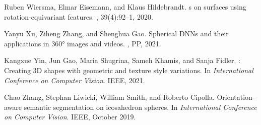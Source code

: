 \documentclass[10pt,twocolumn,letterpaper]{article}
\begin{document}
\begin{thebibliography}{10}
Ruben Wiersma, Elmar Eisemann, and Klaus Hildebrandt.
s on surfaces using rotation-equivariant features.
, 39(4):92--1, 2020.

Yanyu Xu, Ziheng Zhang, and Shenghua Gao.
\newblock Spherical {DNNs} and their applications in 360° images and videos.
, PP,
  2021.

Kangxue Yin, Jun Gao, Maria Shugrina, Sameh Khamis, and Sanja Fidler.
: Creating {3D} shapes with geometric and texture style
  variations.
\newblock In {\em International Conference on Computer Vision}. IEEE, 2021.

Chao Zhang, Stephan Liwicki, William Smith, and Roberto Cipolla.
\newblock Orientation-aware semantic segmentation on icosahedron spheres.
\newblock In {\em International Conference on Computer Vision}. IEEE, October
  2019.

\end{thebibliography}
 
\end{document}
